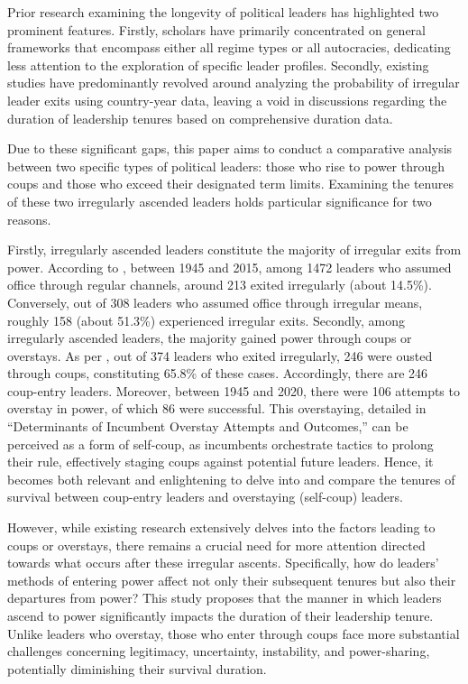 \documentclass[
  12pt,
  a4paper,
  12pt]{article}
\begin{document}
Prior research examining the longevity of political leaders has
highlighted two prominent features. Firstly, scholars have primarily
concentrated on general frameworks that encompass either all regime
types or all autocracies, dedicating less attention to the exploration
of specific leader profiles. Secondly, existing studies have
predominantly revolved around analyzing the probability of irregular
leader exits using country-year data, leaving a void in discussions
regarding the duration of leadership tenures based on comprehensive
duration data.

Due to these significant gaps, this paper aims to conduct a comparative
analysis between two specific types of political leaders: those who rise
to power through coups and those who exceed their designated term
limits. Examining the tenures of these two irregularly ascended leaders
holds particular significance for two reasons.

Firstly, irregularly ascended leaders constitute the majority of
irregular exits from power. According to \citep{goemans2009}, between
1945 and 2015, among 1472 leaders who assumed office through regular
channels, around 213 exited irregularly (about 14.5\%). Conversely, out
of 308 leaders who assumed office through irregular means, roughly 158
(about 51.3\%) experienced irregular exits. Secondly, among irregularly
ascended leaders, the majority gained power through coups or overstays.
As per \citep{goemans2009}, out of 374 leaders who exited irregularly,
246 were ousted through coups, constituting 65.8\% of these cases.
Accordingly, there are 246 coup-entry leaders. Moreover, between 1945
and 2020, there were 106 attempts to overstay in power, of which 86 were
successful. This overstaying, detailed in ``Determinants of Incumbent
Overstay Attempts and Outcomes,'' can be perceived as a form of
self-coup, as incumbents orchestrate tactics to prolong their rule,
effectively staging coups against potential future leaders. Hence, it
becomes both relevant and enlightening to delve into and compare the
tenures of survival between coup-entry leaders and overstaying
(self-coup) leaders.

However, while existing research extensively delves into the factors
leading to coups or overstays, there remains a crucial need for more
attention directed towards what occurs after these irregular ascents.
Specifically, how do leaders' methods of entering power affect not only
their subsequent tenures but also their departures from power? This
study proposes that the manner in which leaders ascend to power
significantly impacts the duration of their leadership tenure. Unlike
leaders who overstay, those who enter through coups face more
substantial challenges concerning legitimacy, uncertainty, instability,
and power-sharing, potentially diminishing their survival duration.
\end{document}
